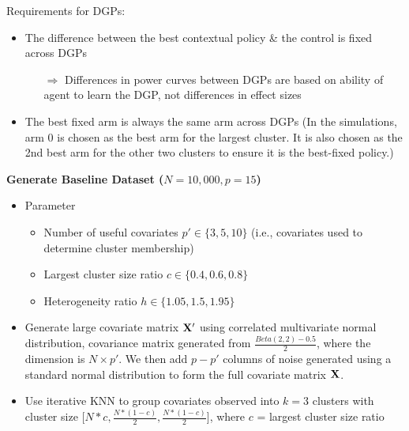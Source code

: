 \documentclass[letterpaper, 12pt, parskip=full,DIV=10]{scrartcl}
\begin{document}
Requirements for DGPs:
\begin{itemize}
    \item The difference between the best contextual policy \& the control is fixed across DGPs
    \begin{itemize}
        \item[$\Rightarrow$] Differences in power curves between DGPs are based on ability of agent to learn the DGP, not differences in effect sizes
    \end{itemize}
    \item The best fixed arm is always the same arm across DGPs (In the simulations, arm 0 is chosen as the best arm for the largest cluster. It is also chosen as the 2nd best arm for the other two clusters to ensure it is the best-fixed policy.)
\end{itemize}


\textbf{Generate Baseline Dataset ($N = 10,000, p = 15$)}
\begin{itemize}
    \item Parameter \begin{itemize}
        \item Number of useful covariates $p' \in \{3, 5, 10\}$ (i.e., covariates used to determine cluster membership)
        \item Largest cluster size ratio $c \in \{0.4, 0.6, 0.8\}$
        \item Heterogeneity ratio $h \in \{1.05, 1.5, 1.95\}$
    \end{itemize}
    \item Generate large covariate matrix $\mathbf{X}'$ using correlated multivariate normal distribution, covariance matrix generated from $\frac{Beta(2,2) - 0.5}{2}$, where the dimension is $N \times p'$. We then add $p - p'$ columns of noise generated using a standard normal distribution to form the full covariate matrix $\mathbf{X}$.
    \item Use iterative KNN to group covariates observed into $k = 3$ clusters with cluster size [$N*c, \frac{N * (1-c)}{2}, \frac{N * (1-c)}{2}$], where $c$ = largest cluster size ratio
\end{itemize}
\end{document}
